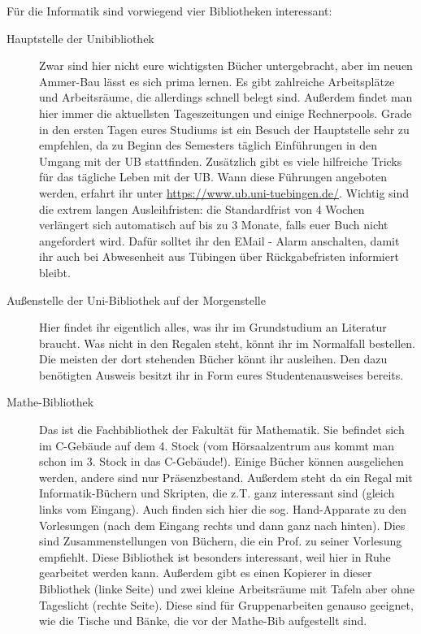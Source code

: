 Für die Informatik sind vorwiegend vier Bibliotheken interessant:
\begin{description}
	\item[Hauptstelle der Unibibliothek] Zwar sind hier nicht eure wichtigsten
	Bücher untergebracht, aber im neuen Ammer-Bau lässt es sich prima
	lernen. Es gibt zahlreiche Arbeitsplätze und Arbeitsräume, die
	allerdings schnell belegt sind. Außerdem findet man hier immer die
	aktuellsten Tageszeitungen und einige Rechnerpools.
	Grade in den ersten Tagen eures Studiums ist ein Besuch der Hauptstelle
	sehr zu empfehlen, da zu Beginn des Semesters täglich Einführungen in den Umgang mit der UB stattfinden. Zusätzlich gibt es viele hilfreiche Tricks für das tägliche Leben mit der UB. Wann diese Führungen angeboten werden, erfahrt ihr unter  \url{https://www.ub.uni-tuebingen.de/}. Wichtig sind die extrem langen Ausleihfristen: die Standardfrist von 4 Wochen verlängert sich automatisch auf bis zu 3 Monate, falls euer Buch nicht angefordert wird. Dafür solltet ihr den EMail - Alarm anschalten, damit ihr auch bei Abwesenheit aus Tübingen über Rückgabefristen informiert bleibt. 	%
	
	\item[Außenstelle der Uni-Bibliothek auf der Morgenstelle]
	Hier findet ihr eigentlich alles, was ihr im Grundstudium an
	Literatur braucht.  Was nicht in den Regalen steht, könnt ihr
	im Normalfall bestellen.  Die meisten der dort stehenden Bücher könnt ihr
	ausleihen. Den dazu benötigten Ausweis besitzt ihr in Form eures Studentenausweises bereits.
	
	\item[Mathe-Bibliothek]
	Das ist die Fachbibliothek der Fakultät für Mathematik.  Sie
	befindet sich im C-Gebäude auf dem 4. Stock (vom
	Hörsaalzentrum aus kommt man schon im 3. Stock in das
	C-Gebäude!). Einige Bücher können ausgeliehen werden,
	andere sind nur Präsenzbestand.  Außerdem steht da ein Regal
	mit Informatik-Büchern und Skripten, die z.T. ganz
	interessant sind (gleich links vom Eingang).  Auch finden sich
	hier die sog. Hand-Apparate zu den Vorlesungen (nach dem
	Eingang rechts und dann ganz nach hinten).  Dies sind
	Zusammenstellungen von Büchern, die ein Prof. zu seiner
	Vorlesung empfiehlt.  Diese Bibliothek ist besonders
	interessant, weil hier in Ruhe gearbeitet werden kann.
	Außerdem gibt es einen Kopierer in dieser Bibliothek (linke
	Seite) und zwei kleine Arbeitsräume mit Tafeln aber ohne
	Tageslicht (rechte Seite).  Diese sind für Gruppenarbeiten
	genauso geeignet, wie die Tische und Bänke, die vor der
	Mathe-Bib aufgestellt sind.
	

\end{description}
